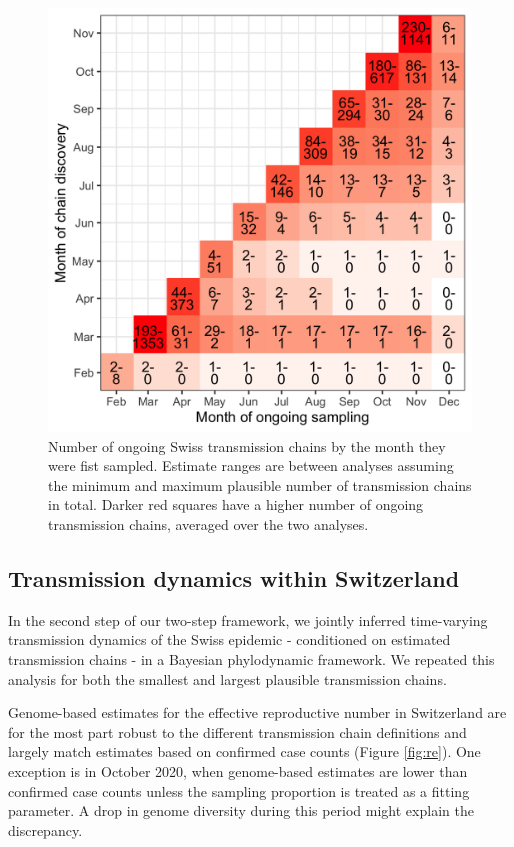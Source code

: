 \documentclass[9pt,twocolumn,twoside,lineno]{pnas-new}
\begin{document}
\begin{figure}[tbhp]
\centering
\includegraphics[width=.8\linewidth]{figures/chain_longevity_matrix.png}
\caption{Number of ongoing Swiss transmission chains by the month they were fist sampled. Estimate ranges are between analyses assuming the minimum and maximum plausible number of transmission chains in total. Darker red squares have a higher number of ongoing transmission chains, averaged over the two analyses.}
\label{fig:chain-longevity}
\end{figure}

\subsection{Transmission dynamics within Switzerland}

In the second step of our two-step framework, we jointly inferred time-varying transmission dynamics of the Swiss epidemic - conditioned on estimated transmission chains - in a Bayesian phylodynamic framework. We repeated this analysis for both the smallest and largest plausible transmission chains. 

Genome-based estimates for the effective reproductive number in Switzerland are for the most part robust to the different transmission chain definitions and largely match estimates based on confirmed case counts (Figure \ref{fig:re}). One exception is in October 2020, when genome-based estimates are lower than confirmed case counts unless the sampling proportion is treated as a fitting parameter. A drop in genome diversity during this period might explain the discrepancy. 
\end{document}
